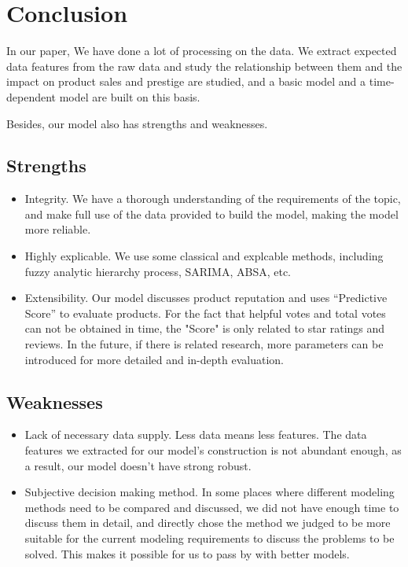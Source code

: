 \documentclass[12pt]{article}  %
\begin{document}
\section{Conclusion}

In our paper, We have done a lot of processing on the data. We extract expected data features from the raw data and study the relationship between them and the impact on product sales and prestige are studied, and a basic model and a time-dependent model are built on this basis.

Besides, our model also has strengths and weaknesses.
\subsection{Strengths}
\begin{itemize}
    \item Integrity. We have a thorough understanding of the requirements of the topic, and make full use of the data provided to build the model, making the model more reliable.
    \item Highly explicable. We use some classical and explcable methods, including fuzzy analytic hierarchy process, SARIMA, ABSA, etc.
    \item Extensibility. Our model discusses product reputation and uses “Predictive Score” to evaluate products. For the fact that helpful votes and total votes can not be obtained in time, the "Score" is only related to star ratings and reviews. In the future, if there is related research, more parameters can be introduced for more detailed and in-depth evaluation.
\end{itemize}

\subsection{Weaknesses}
\begin{itemize}
    \item Lack of necessary data supply. Less data means less features. The data features we extracted for our model's construction is not abundant enough, as a result, our model doesn't have strong robust.
    \item Subjective decision making method. In some places where different modeling methods need to be compared and discussed, we did not have enough time to discuss them in detail, and directly chose the method we judged to be more suitable for the current modeling requirements to discuss the problems to be solved. This makes it possible for us to pass by with better models.
 \end{itemize}
\end{document}
